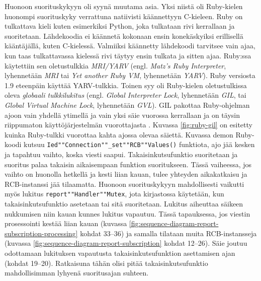 Huonoon suorituskykyyn oli syynä muutama asia. Yksi niistä oli Ruby-kielen huonompi suorituskyky verrattuna natiivisti käännettyyn C-kieleen. Ruby on tulkattava kieli kuten esimerkiksi Python, joka tulkataan rivi kerrallaan ja suoritetaan. Lähdekoodia ei käännetä kokonaan ensin konekäskyiksi erillisellä kääntäjällä, kuten C-kielessä. Valmiiksi käännetty lähdekoodi tarvitsee vain ajaa, kun taas tulkattavassa kielessä rivi täytyy ensin tulkata ja sitten ajaa. Ruby:ssa käytettiin sen oletustulkkia \emph{MRI/YARV} (engl. \emph{Matz's Ruby Interpreter}, lyhennetään \emph{MRI} tai \emph{Yet another Ruby VM}, lyhennetään \emph{YARV}). Ruby versiosta 1.9 eteenpäin käyttää YARV-tulkkia. Toinen syy oli Ruby-kielen oletustulkissa oleva \emph{globaali tulkkilukitus} (engl. \emph{Global Interpreter Lock}, lyhennetään \emph{GIL}, tai \emph{Global Virtual Machine Lock}, lyhennetään \emph{GVL}). GIL pakottaa Ruby-ohjelman ajoon vain yhdellä ytimellä ja vain yksi säie vuorossa kerrallaan ja on täysin riippumaton käyttöjärjestelmän vuorottajasta \mbox{\cite[s.~131--133]{Odaira2014}}. Kuvassa \ref{fig:ruby-gil} on esitetty kuinka Ruby-tulkki vuorottaa kahta ajossa olevaa säiettä. Kuvassa demon Ruby-koodi kutsuu \texttt{Ied""Connection""\_set""RCB""Values()} funktiota, ajo jää kesken ja tapahtuu vaihto, koska viesti saapui. Takaisinkutsufunktio suoritetaan ja suoritus palaa takaisin aikaisempaan funktion suoritukseen. Tässä vaiheessa, jos vaihto on huonolla hetkellä ja kesti liian kauan, tulee yhteyden aikakatkaisu ja RCB-instanssi jää tilaamatta. Huonoon suorituskykyyn mahdollisesti vaikutti myös lukitus \texttt{report""Handler""Mutex}, jota kirjastossa käytetään, kun takaisinkutsufunktio asetetaan tai sitä suoritetaan. Lukitus aiheuttaa säikeen nukkumisen niin kauan kunnes lukitus vapautuu. Tässä tapauksessa, jos viestin prosessointi kestää liian kauan (kuvassa \ref{fig:sequence-diagram-report-subscription-processing} kohdat 33--36) ja samalla tilataan muita RCB-instansseja (kuvassa \ref{fig:sequence-diagram-report-subscription} kohdat 12--26). Säie joutuu odottamaan lukituksen vapautusta takaisinkutsufunktion asettamisen ajan (kohdat 19--20). Ratkaisuna tähän olisi pitää takaisinkutsufunktio mahdollisimman lyhyenä suoritusajan suhteen. \mbox{\cite{Kozlovski2017, Storimer2013}}

